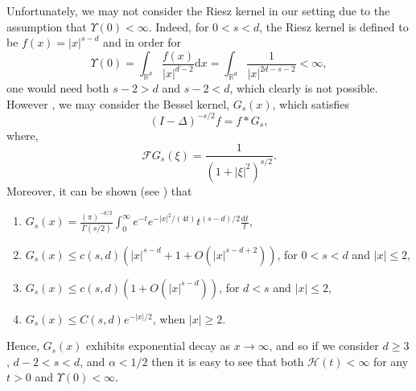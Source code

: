\documentclass{article}
\numberwithin{equation}{section}
\newcommand{\R}{\mathbb{R}}
\newcommand{\ud}{\ensuremath{\mathrm{d}}}
\begin{document}
Unfortunately, we may not consider the Riesz kernel in our setting due to the assumption that $\Upsilon(0) < \infty$. Indeed, for $0<s<d$, the Riesz kernel is defined to be $f(x) = |x|^{s-d}$ and in order for
	\[
		\Upsilon(0) = \int_{\R^d} \frac{f(x)}{|x|^{d-2}} \ud x =
		\int_{\R^d} \frac{1}{|x|^{2d-s-2}} < \infty,
	\]
one would need both $s-2 > d$ and $s-2 < d$, which clearly is not possible. However , we may consider the Bessel kernel, $G_s(x)$, which satisfies
	\[
		(I-\Delta)^{-s/2}f = f * G_s,
	\]
where,
	\[
	  \mathcal{F}G_s(\xi) = \frac{1}{(1+  |\xi|^2)^{s/2}}.
	\]
	Moreover, it can be shown (see \cite[Proposition
	1.2.5]{Gra14}) that
	\begin{enumerate}
		\item $G_s(x) = \frac{(\pi)^{-d/2}}{\Gamma(s/2)}\int_0^\infty e^{-t}e^{-|x|^2/(4t)} t^{(s-d)/2} \frac{\ud t}{t}$,
		\item $G_s(x) \le c(s,d) \left( |x|^{s-d} + 1 + O(|x|^{s-d+2}) \right)$, for $0<s<d$ and $|x| \le 2$,
		\item $G_s(x) \le c(s,d) \left(1 + O(|x|^{s-d}) \right)$, for $d<s$ and $|x| \le 2$,
		\item $G_s(x) \le C(s,d)e^{-|x|/2}$, when $|x| \ge 2$.
	\end{enumerate}
Hence, $G_s(x)$ exhibits exponential decay as $x \to \infty$, and so if we
consider $d \ge 3$, $d-2 < s < d$, and $\alpha < 1/2$ then it is easy to see
that both $\mathcal{H}(t) < \infty$ for any $t>0$ and $\Upsilon(0) < \infty$.
\end{document}
